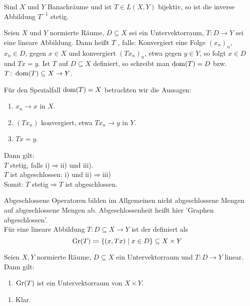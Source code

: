 \begin{korollar}
	Sind $ X $ und $ Y $ Banachr\"aume und ist $ T\in L(X,Y) $ bijektiv, so ist die inverse Abbildung $ T^{-1} $ stetig.
\end{korollar}
\begin{definition}
	Seien $ X $ und $ Y $ normierte R\"aume, $ D\subseteq X $ sei ein Untervektorraum, $ T\colon D\rightarrow Y $ sei eine lineare Abbildung. Dann hei\ss t $ T $ , falls: Konvergiert eine Folge $ (x_n)_n $, $ x_n\in D $, gegen $ x\in X $ und konvergiert $ (Tx_n)_n $, etwa gegen $ y\in Y $, so folgt $ x\in D $ und $ Tx=y $. Ist $ T $ auf $ D\subseteq X $ definiert, so schreibt man $ \operatorname{dom}(T)=D $ bzw. $ T\colon\operatorname{dom}(T)\subseteq X\rightarrow Y $. 
\end{definition}
\begin{bemerkung*}
	F\"ur den Spezialfall $ \operatorname{dom}(T)=X $ betrachten wir die Aussagen:
	\begin{enumerate}
		\item $ x_n\rightarrow x $ in $ X $.
		\item $ (Tx_n) $ konvergiert, etwa $ Tx_n\rightarrow y $ in $ Y $.
		\item $ Tx=y $.
	\end{enumerate}
	Dann gilt:\\
	$ T $ stetig, falls i)$ \Rightarrow $ii) und iii).\\
	$ T $ ist abgeschlossen: i) und ii)$ \Rightarrow $iii)\\
	Somit: $ T $ stetig$ \Rightarrow T$ ist abgeschlossen.
\end{bemerkung*}
\begin{bemerkung*}
	Abgeschlossene Operatoren bilden im Allgemeinen nicht abgeschlossene Mengen auf abgeschlossene Mengen ab. Abgeschlossenheit hei\ss t hier 'Graphen abgeschlossen'.\\
	F\"ur eine lineare Abbildung $ T\colon D\subseteq X\rightarrow Y $ ist der  definiert als
	\[ \operatorname{Gr}(T)\coloneqq\lbrace (x,Tx)\mid x\in D\rbrace\subseteq X\times Y \] 
\end{bemerkung*}
\begin{lemma}
	Seien $ X,Y $ normierte R\"aume, $ D\subseteq X $ ein Untervektorraum und $ T\colon D\rightarrow Y $ linear. Dann gilt:
	\begin{enumerate}
		\item $ \operatorname{Gr}(T) $ ist ein Untervektorraum von $ X\times Y $.
	\end{enumerate}
\end{lemma}
\begin{beweis}
	\begin{enumerate}
		\item Klar.
	\end{enumerate}
\end{beweis}